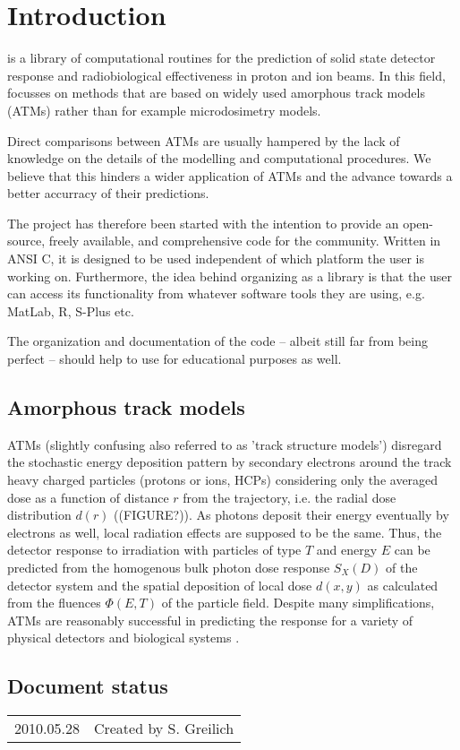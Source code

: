 
\chapter{Introduction}

\la{} is a library of computational routines for the prediction of solid state detector response and radiobiological effectiveness in proton and ion beams. In this field, \la{} focusses on methods that are based on widely used amorphous track models (ATMs) rather than for example microdosimetry models.

Direct comparisons between ATMs are usually hampered by the lack of knowledge on the details of the modelling and computational procedures. We believe that this hinders a wider application of ATMs and the advance towards a better accurracy of their predictions. 

The \la{} project has therefore been started with the intention to provide an open-source, freely available, and comprehensive code for the community. Written in ANSI C, it is designed to be used independent of which platform the user is working on. Furthermore, the idea behind organizing \la{} as a library is that the user can access its functionality from whatever software tools they are using, e.g. MatLab, R, S-Plus etc.

The organization and documentation of the code -- albeit still far from being perfect -- should help to use \la{} for educational purposes as well.


\section{Amorphous track models}

ATMs (slightly confusing also referred to as 'track structure models') disregard the stochastic energy deposition pattern by secondary electrons around the track heavy charged particles (protons or ions, HCPs) considering only the averaged dose as a function of distance $r$ from the trajectory, i.e. the radial dose distribution $d(r)$ (\mbox{(FIGURE?)}). As photons deposit their energy eventually by electrons as well, local radiation effects are supposed to be the same. Thus, the detector response to irradiation with particles of type $T$ and energy $E$ can be predicted from the homogenous bulk photon dose response $S_X(D)$ of the detector system and the spatial deposition of local dose $d(x,y)$ as calculated from the fluences $\Phi(E, T)$ of the particle field. Despite many simplifications, ATMs are reasonably successful in predicting the response for a variety of physical detectors and biological systems \cite{Katz_et_al_1972, Waligorski_and_Katz_1980, Geiss_et_al_1997, Bassler_et_al_2008}. 


\section*{Document status}
\begin{tabular}{l l}
2010.05.28&Created by S. Greilich
\end{tabular}